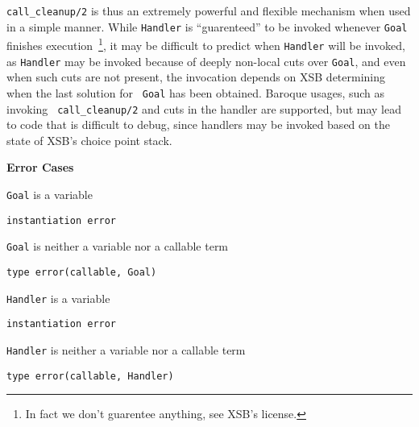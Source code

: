 \begin{description}
{\tt call\_cleanup/2} is thus an extremely powerful and flexible
mechanism when used in a simple manner.  While {\tt Handler} is
``guarenteed'' to be invoked whenever {\tt Goal} finishes
execution~\footnote{In fact we don't guarentee anything, see XSB's
  license.}, it may be difficult to predict when {\tt Handler} will be
invoked, as {\tt Handler} may be invoked because of deeply non-local
cuts over {\tt Goal}, and even when such cuts are not present, the
invocation depends on XSB determining when the last solution for {\tt
  Goal} has been obtained.  Baroque usages, such as invoking {\tt
  call\_cleanup/2} and cuts in the handler are supported, but may lead
to code that is difficult to debug, since handlers may be invoked
based on the state of XSB's choice point stack.  

{\bf Error Cases}
\begin{description}
\item  {\tt Goal} is a variable
\bi
\item {\tt instantiation error}
\ei
\item  {\tt Goal} is neither a variable nor a callable term
\bi
\item  {\tt type error(callable, Goal)}
\ei
\item  {\tt Handler} is a variable
\bi
\item  {\tt instantiation error}
\ei
\item  {\tt Handler} is neither a variable nor a callable term
\bi
\item {\tt type error(callable, Handler)}
\ei
\end{description}

\end{description}



